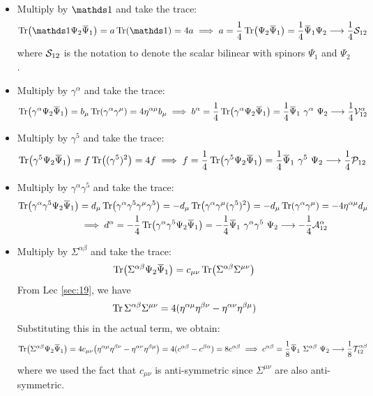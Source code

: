 \begin{itemize}
    \item Multiply by $\iden$ and take the trace: 
    \begin{align*}
        \Tr (\iden  \Psi_2 \dadj{\Psi}_1) = a \Tr (\iden) = 4a \implies a = \frac{1}{4}\Tr ( \Psi_2 \dadj{\Psi}_1) = \frac{1}{4}\dadj{\Psi}_1 \Psi_2 \longrightarrow \frac{1}{4}\Ss_{12}
    \end{align*}
    where $\mathcal S_{12}$ is the notation to denote the scalar bilinear with spinors $\Psi_1$ and $\Psi_2$. 
    \item Multiply by $\gamma^\alpha$ and take the trace:
    \begin{align*}
        \Tr (\gamma^\alpha  \Psi_2 \dadj{\Psi}_1) = b_\mu \Tr (\gamma^\alpha \gamma^\mu) = 4\eta^{\alpha\mu}b_{\mu} \implies b^{\alpha} = \frac{1}{4}\Tr (\gamma^\alpha \Psi_2 \dadj{\Psi}_1) =  \frac{1}{4}\bilin{1}{2}{\gamma^\alpha} \longrightarrow  \frac{1}{4}\SV^\alpha_{12}
    \end{align*}
    \item Multiply by $\gamma^5$ and take the trace: 
    \begin{align*}
        \Tr(\gamma^5  \Psi_2 \dadj{\Psi}_1) = f \Tr((\gamma^5)^2) = 4f \implies f = \frac{1}{4}\Tr(\gamma^5  \Psi_2 \dadj{\Psi}_1) = \frac{1}{4}\bilin{1}{2}{\gamma^5}\longrightarrow \frac{1}{4}\SP_{12}
    \end{align*}
    \item Multiply by $\gamma^\alpha\gamma^5$ and take the trace: \begin{align*}
        \Tr(\gamma^\alpha\gamma^5  \Psi_2 \dadj{\Psi}_1) &= d_\mu \Tr(\gamma^\alpha\gamma^5\gamma^\mu\gamma^5)=-d_\mu \Tr(\gamma^\alpha\gamma^\mu (\gamma^5)^2) =-d_\mu \Tr(\gamma^\alpha\gamma^\mu) = -4\eta^{\alpha\mu}d_\mu\\ &\implies d^\alpha = -\frac{1}{4}\Tr(\gamma^\alpha\gamma^5  \Psi_2 \dadj{\Psi}_1) = -\frac{1}{4}\bilin{1}{2}{\gamma^\alpha\gamma^5}\longrightarrow - \frac{1}{4}\SA^\alpha_{12}
    \end{align*}
    \item Multiply by $\Sigma^{\alpha\beta}$ and take the trace: \begin{align*}
         \Tr(\Sigma^{\alpha\beta}  \Psi_2 \dadj{\Psi}_1) = c_{\mu\nu} \Tr(\Sigma^{\alpha\beta}\Sigma^{\mu\nu})
    \end{align*}
    From Lec \ref{sec:19}, we have 
     $$\Tr \Sigma^{\alpha\beta}\Sigma^{\mu\nu} = 4(\eta^{\alpha\mu}\eta^{\beta\nu}-\eta^{\alpha\nu}\eta^{\beta\mu} )$$
    Substituting this in the actual term, we obtain:
    \begin{align*}
         \Tr(\Sigma^{\alpha\beta}  \Psi_2 \dadj{\Psi}_1) = 4c_{\mu\nu}\qty(\eta^{\alpha\mu}\eta^{\beta\nu}-\eta^{\alpha\nu}\eta^{\beta\mu} ) = 4(c^{\alpha\beta} - c^{\beta\alpha}) = 8 c^{\alpha\beta}\implies  c^{\alpha\beta} = \frac{1}{8}\bilin{1}{2}{\Sigma^{\alpha\beta}}\longrightarrow  \frac{1}{8}\ST^{\alpha\beta}_{12}
    \end{align*}
    where we used the fact that $c_{\mu\nu}$ is anti-symmetric since $\Sigma^{\mu\nu}$ are also anti-symmetric. 
\end{itemize}
